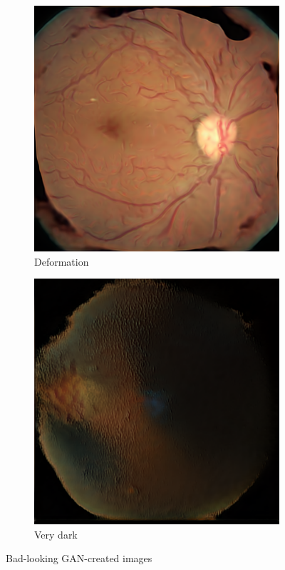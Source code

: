 \documentclass[sigconf,nonacm]{acmart}
\begin{document}
\begin{figure}[H]
\centering
\begin{subfigure}{0.38\linewidth}
\centering
\includegraphics[width=0.9\linewidth]{bad-sample-class3.png}
\caption{Deformation}
\end{subfigure}
\begin{subfigure}{0.38\linewidth}
\centering
\includegraphics[width=0.9\linewidth]{bad-sample-class4.png}
\caption{Very dark}
\end{subfigure}
\caption{Bad-looking GAN-created images}
\label{fig:gan-fails}
\end{figure}
\end{document}
